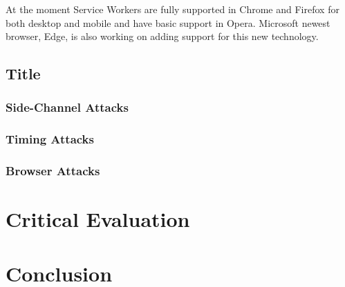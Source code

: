 \documentclass[10pt,a4paper,twoside]{book}
\begin{document}
At the moment Service Workers are fully supported in Chrome and Firefox for both desktop and mobile and have basic support in Opera. Microsoft newest browser, Edge, is also working on adding support for this new technology.

\section{Title}

\subsection{Side-Channel Attacks}

\subsection{Timing Attacks}

\subsection{Browser Attacks}











\chapter{Critical Evaluation}
\label{chap:evaluation}



\chapter{Conclusion}
\label{chap:conclusion}
\end{document}
